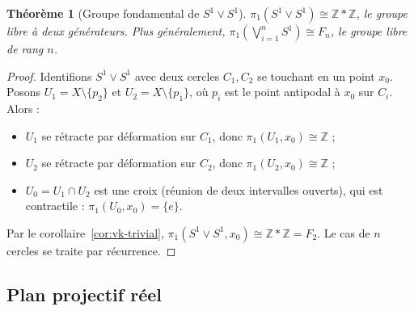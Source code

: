 \documentclass[12pt,a4paper,openany]{book}
\theoremstyle{definition}
\theoremstyle{plain}
\newtheorem{theoreme}[definition]{Théorème}
\theoremstyle{remark}
\newcommand{\Z}{\mathbb{Z}}
\begin{document}
\begin{center}
\end{center}

\begin{theoreme}[{Groupe fondamental de $S^1 \vee S^1$}]\label{thm:pi1-bouquet}
$\pi_1(S^1 \vee S^1) \cong \Z * \Z$, le groupe libre à deux générateurs.
Plus généralement, $\pi_1\!\left(\bigvee_{i=1}^n S^1\right) \cong F_n$, le groupe libre
de rang $n$.
\end{theoreme}

\begin{proof}
Identifions $S^1 \vee S^1$ avec deux cercles $C_1, C_2$ se touchant en un point $x_0$.
Posons $U_1 = X \setminus \{p_2\}$ et $U_2 = X \setminus \{p_1\}$, où $p_i$ est le point
antipodal à $x_0$ sur $C_i$. Alors :
\begin{itemize}
\item $U_1$ se rétracte par déformation sur $C_1$, donc $\pi_1(U_1, x_0) \cong \Z$ ;
\item $U_2$ se rétracte par déformation sur $C_2$, donc $\pi_1(U_2, x_0) \cong \Z$ ;
\item $U_0 = U_1 \cap U_2$ est une croix (réunion de deux intervalles ouverts), qui est contractile :
$\pi_1(U_0, x_0) = \{e\}$.
\end{itemize}
Par le corollaire~\ref{cor:vk-trivial},
$\pi_1(S^1 \vee S^1, x_0) \cong \Z * \Z = F_2$.
Le cas de $n$ cercles se traite par récurrence.
\end{proof}

\subsection{Plan projectif réel}\label{subsec:rp2}
\end{document}
